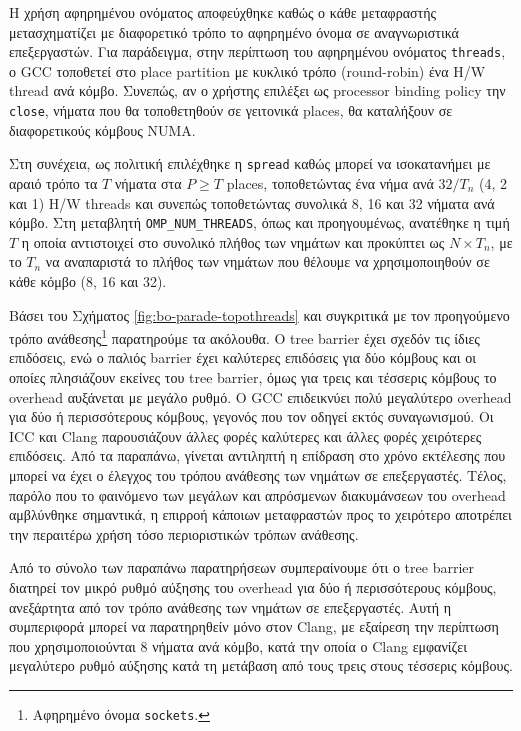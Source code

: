 Η χρήση αφηρημένου ονόματος αποφεύχθηκε καθώς ο κάθε μεταφραστής μετασχηματίζει με διαφορετικό τρόπο το αφηρημένο όνομα σε αναγνωριστικά επεξεργαστών. Για παράδειγμα, στην περίπτωση του αφηρημένου ονόματος \texttt{threads}, ο GCC τοποθετεί στο place partition με κυκλικό τρόπο (round-robin) ένα H/W thread ανά κόμβο. Συνεπώς, αν ο χρήστης επιλέξει ως processor binding policy την \texttt{close}, νήματα που θα τοποθετηθούν σε γειτονικά places, θα καταλήξουν σε διαφορετικούς κόμβους NUMA.

Στη συνέχεια, ως πολιτική επιλέχθηκε η \texttt{spread} καθώς μπορεί να ισοκατανήμει με αραιό τρόπο τα $T$ νήματα στα $P \geq T$ places, τοποθετώντας ένα νήμα ανά $32 / T_n$ (4, 2 και 1) H/W threads και συνεπώς τοποθετώντας συνολικά 8, 16 και 32 νήματα ανά κόμβο. Στη μεταβλητή \texttt{OMP\_NUM\_THREADS}, όπως και προηγουμένως, ανατέθηκε η τιμή $T$ η οποία αντιστοιχεί στο συνολικό πλήθος των νημάτων και προκύπτει ως $N \times T_n$, με το $T_n$ να αναπαριστά το πλήθος των νημάτων που θέλουμε να χρησιμοποιηθούν σε κάθε κόμβο (8, 16 και 32).

Βάσει του Σχήματος \ref{fig:bo-parade-topothreads} και συγκριτικά με τον προηγούμενο τρόπο ανάθεσης\footnote{Αφηρημένο όνομα \texttt{sockets}.} παρατηρούμε τα ακόλουθα. Ο tree barrier έχει σχεδόν τις ίδιες επιδόσεις, ενώ ο παλιός barrier έχει καλύτερες επιδόσεις για δύο κόμβους και οι οποίες πλησιάζουν εκείνες του tree barrier, όμως για τρεις και τέσσερις κόμβους το overhead αυξάνεται με μεγάλο ρυθμό. Ο GCC επιδεικνύει πολύ μεγαλύτερο overhead για δύο ή περισσότερους κόμβους, γεγονός που τον οδηγεί εκτός συναγωνισμού. Οι ICC και Clang παρουσιάζουν άλλες φορές καλύτερες και άλλες φορές χειρότερες επιδόσεις. Από τα παραπάνω, γίνεται αντιληπτή η επίδραση στο χρόνο εκτέλεσης που μπορεί να έχει ο έλεγχος του τρόπου ανάθεσης των νημάτων σε επεξεργαστές. Τέλος, παρόλο που το φαινόμενο των μεγάλων και απρόσμενων διακυμάνσεων του overhead αμβλύνθηκε σημαντικά, η επιρροή κάποιων μεταφραστών προς το χειρότερο αποτρέπει την περαιτέρω χρήση τόσο περιοριστικών τρόπων ανάθεσης.

Από το σύνολο των παραπάνω παρατηρήσεων συμπεραίνουμε ότι ο tree barrier διατηρεί τον μικρό ρυθμό αύξησης του overhead για δύο ή περισσότερους κόμβους, ανεξάρτητα από τον τρόπο ανάθεσης των νημάτων σε επεξεργαστές. Αυτή η συμπεριφορά μπορεί να παρατηρηθείν μόνο στον Clang, με εξαίρεση την περίπτωση που χρησιμοποιούνται 8 νήματα ανά κόμβο, κατά την οποία ο Clang εμφανίζει μεγαλύτερο ρυθμό αύξησης κατά τη μετάβαση από τους τρεις στους τέσσερις κόμβους.

